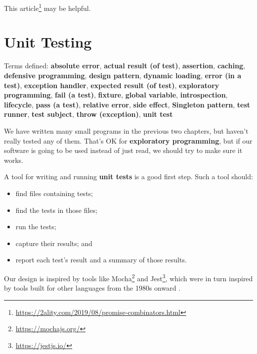 \documentclass[krantzl]{krantz}
\newcommand{\glossref}[1]{\textbf{#1}}
\newcommand{\hreffoot}[2]{{#1}\footnote{\href{#2}{#2}}}
\begin{document}
\hreffoot{This article}{https://2ality.com/2019/08/promise-combinators.html} may be helpful.

\chapter{Unit Testing}\label{unit-test}


\noindent 
  Terms defined: \glossref{absolute error}, \glossref{actual result (of test)}, \glossref{assertion}, \glossref{caching}, \glossref{defensive programming}, \glossref{design pattern}, \glossref{dynamic loading}, \glossref{error (in a test)}, \glossref{exception handler}, \glossref{expected result (of test)}, \glossref{exploratory programming}, \glossref{fail (a test)}, \glossref{fixture}, \glossref{global variable}, \glossref{introspection}, \glossref{lifecycle}, \glossref{pass (a test)}, \glossref{relative error}, \glossref{side effect}, \glossref{Singleton pattern}, \glossref{test runner}, \glossref{test subject}, \glossref{throw (exception)}, \glossref{unit test}



We have written many small programs in the previous two chapters,
but haven’t really tested any of them.
That’s OK for \glossref{exploratory programming},
but if our software is going to be used instead of just read,
we should try to make sure it works.


A tool for writing and running \glossref{unit tests} is a good first step.
Such a tool should:

\begin{itemize}

\item find files containing tests;

\item find the tests in those files;

\item run the tests;

\item capture their results; and

\item report each test’s result and a summary of those results.

\end{itemize}


Our design is inspired by tools like \hreffoot{Mocha}{https://mochajs.org/} and \hreffoot{Jest}{https://jestjs.io/},
which were in turn inspired by tools built for other languages
from the 1980s onward \cite{Meszaros2007,Tudose2020}.
\end{document}
